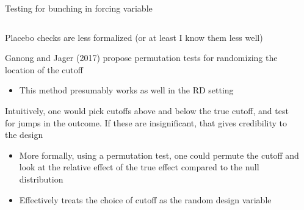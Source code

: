 \documentclass[notes,11pt, aspectratio=169]{beamer}
\newenvironment{wideitemize}{\itemize\addtolength{\itemsep}{10pt}}{\enditemize}
\begin{document}
\begin{frame}{Testing for bunching in forcing variable}
    \begin{columns}[onlytextwidth, T] %
      \begin{column}{0.7\textwidth}
        \begin{wideitemize}
        \item Placebo checks are less formalized (or at least I know them less well)
        \item Ganong and Jager (2017) propose permutation tests for
          randomizing the location of the cutoff
          \begin{itemize}
          \item This method presumably works as well in the RD setting 
          \end{itemize}
        \item Intuitively, one would pick cutoffs above and below the
          true cutoff, and test for jumps in the outcome. If these are
          insignificant, that gives credibility to the design
          \begin{itemize}
          \item More formally, using a permutation test, one could
            permute the cutoff and look at the relative effect of the
            true effect compared to the null distribution
          \item Effectively treats the choice of cutoff as the random
            design variable
          \end{itemize}
        \end{wideitemize}
      \end{column}%
      \hfill%
      \begin{column}{.5\textwidth}
      \end{column}%
    \end{columns}
\end{frame}
\end{document}
